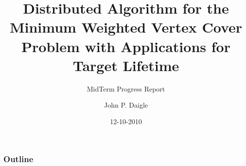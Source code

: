 

\title[MWVC on Random Graphs] %
{Distributed Algorithm for the Minimum Weighted Vertex Cover Problem with Applications for Target Lifetime}

\subtitle
{MidTerm Progress Report} %

\author[] %
{John P. Daigle}



\date[] %
{12-10-2010}

\subject{Talks}














\begin{frame}
  \titlepage
\end{frame}

\begin{frame}
  \frametitle{Outline}
  \tableofcontents
\end{frame}


